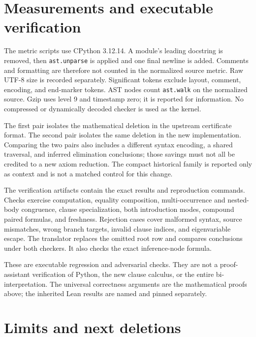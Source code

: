 \documentclass[11pt]{article}
\theoremstyle{definition}\newtheorem{definition}[theorem]{Definition}
\begin{document}
\section{Measurements and executable verification}\label{sec:metrics}

The metric scripts use CPython 3.12.14. A module's leading docstring
is removed, then \texttt{ast.unparse} is applied and one final newline
is added. Comments and formatting are therefore not counted in the
normalized source metric. Raw UTF-8 size is recorded separately.
Significant tokens exclude layout, comment, encoding, and end-marker
tokens. AST nodes count \texttt{ast.walk} on the normalized source.
Gzip uses level 9 and timestamp zero; it is reported for information.
No compressed or dynamically decoded checker is used as the kernel.



The first pair isolates the mathematical deletion in the upstream
certificate format. The second pair isolates the same deletion in
the new implementation. Comparing the two pairs also includes a
different syntax encoding, a shared traversal, and inferred elimination
conclusions; those savings must not all be credited to a new axiom
reduction. The compact historical family is reported only as context
and is not a matched control for this change.



The verification artifacts contain the exact results and reproduction
commands. Checks exercise computation, equality composition,
multi-occurrence and nested-body congruence, clause specialization,
both introduction modes, compound paired formulas, and freshness.
Rejection cases cover malformed syntax, source mismatches, wrong
branch targets, invalid clause indices, and eigenvariable escape.
The translator replaces the omitted root row and compares conclusions
under both checkers. It also checks the exact inference-node formula.

These are executable regression and adversarial checks. They are not
a proof-assistant verification of Python, the new clause calculus, or
the entire bi-interpretation. The universal correctness arguments are
the mathematical proofs above; the inherited Lean results are named
and pinned separately.

\section{Limits and next deletions}
\end{document}
